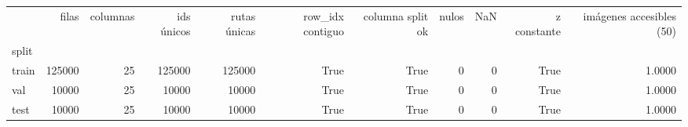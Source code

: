 \begin{tabular}{lrrrrrrrrrr}
\toprule
 & filas & columnas & ids únicos & rutas únicas & row\_idx contiguo & columna split ok & nulos & NaN & z constante & imágenes accesibles (50) \\
split &  &  &  &  &  &  &  &  &  &  \\
\midrule
train & 125000 & 25 & 125000 & 125000 & True & True & 0 & 0 & True & 1.0000 \\
val & 10000 & 25 & 10000 & 10000 & True & True & 0 & 0 & True & 1.0000 \\
test & 10000 & 25 & 10000 & 10000 & True & True & 0 & 0 & True & 1.0000 \\
\bottomrule
\end{tabular}
